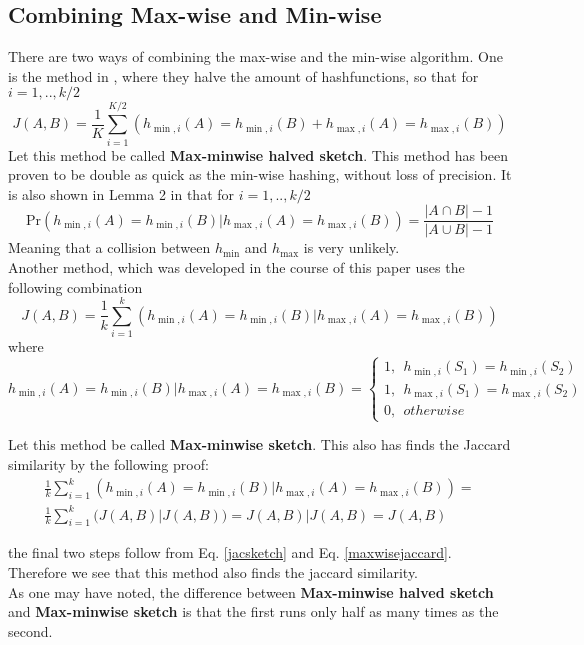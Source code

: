 \documentclass[../../main.tex]{subfiles}
\begin{document}
\subsection{Combining Max-wise and Min-wise}

There are two ways of combining the max-wise and the min-wise algorithm. One is the method in \cite{minmaxhash}, where they halve the amount of hashfunctions, so that for $i=1,..,k/2$
\begin{equation}\label{minmaxhalfjaccard}
J(A,B)=\frac{1}{K}\sum_{i=1}^{K/2}(h_{\min,i}(A) = h_{\min,i}(B) + h_{\max,i}(A) = h_{\max,i}(B))
\end{equation}
Let this method be called \textbf{Max-minwise halved sketch}. This method has been proven to be double as quick as the min-wise hashing, without loss of precision\cite{minmaxhash}. It is also shown in Lemma 2 in \cite{minmaxhash} that for $i=1,..,k/2$
$$
\mathrm{Pr}(h_{\min,i}(A) = h_{\min,i}(B) | h_{\max,i}(A) = h_{\max,i}(B)) = \frac{|A\cap B|-1}{|A\cup B| -1}
$$
Meaning that a collision between $h_{\min}$ and $h_{\max}$ is very unlikely.\\

Another method, which was developed in the course of this paper uses the following combination
\begin{equation}\label{minmaxjaccard}
J(A,B)=\frac{1}{k}\sum_{i=1}^{k}(h_{\min,i}(A) = h_{\min,i}(B) | h_{\max,i}(A) = h_{\max,i}(B))
\end{equation}
where
$$
h_{\min,i}(A) = h_{\min,i}(B) | h_{\max,i}(A) = h_{\max,i}(B) = \left\{ \begin{array}{ll}
												1, \ \ h_{\min,i}(S_1)=h_{\min,i}(S_2)\\
												1, \ \ h_{\max,i}(S_1)=h_{\max,i}(S_2)\\
												0, \ \ otherwise
											  \end{array}\right.
$$

Let this method be called \textbf{Max-minwise sketch}. This also has finds the Jaccard similarity by the following proof:\\
\begin{equation}\label{proofofMinmax}
\begin{split}
\frac{1}{k}\sum_{i=1}^{k}(h_{\min,i}(A) = h_{\min,i}(B) | h_{\max,i}(A) = h_{\max,i}(B)) =\\\frac{1}{k}\sum_{i=1}^{k}(J(A,B) | J(A,B)) = J(A,B)|J(A,B) = J(A,B)
\end{split}
\end{equation}

the final two steps follow from Eq. \ref{jacsketch} and Eq. \ref{maxwisejaccard}. Therefore we see that this method also finds the jaccard similarity.\\

As one may have noted, the difference between \textbf{Max-minwise halved sketch} and \textbf{Max-minwise sketch} is that the first runs only half as many times as the second.
\end{document}
